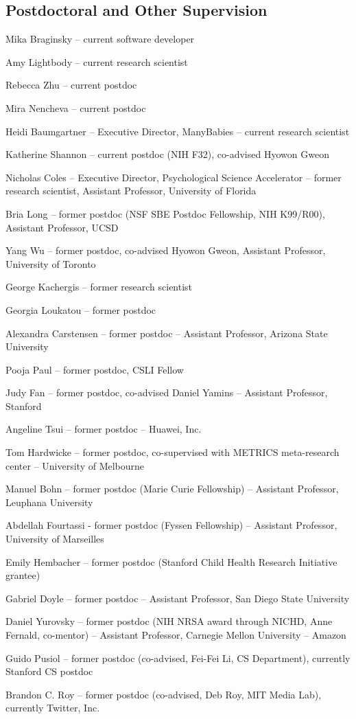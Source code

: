 \documentclass{article}
\renewenvironment{itemize}{
\begin{list}{}{
  \setlength{\leftmargin}{1.5em}
  }
  }{
\end{list}
}
\begin{document}
\subsection*{Postdoctoral and Other Supervision}
\begin{itemize}
  \item Mika Braginsky -- current software developer
  \item Amy Lightbody -- current research scientist
  \item Rebecca Zhu -- current postdoc
  \item Mira Nencheva -- current postdoc
  \item Heidi Baumgartner -- Executive Director, ManyBabies -- current research scientist
  \item Katherine Shannon -- current postdoc (NIH F32), co-advised Hyowon Gweon
  \item Nicholas Coles -- Executive Director, Psychological Science Accelerator -- former research scientist, Assistant Professor, University of Florida
  \item Bria Long -- former postdoc (NSF SBE Postdoc Fellowship, NIH K99/R00), Assistant Professor, UCSD
  \item Yang Wu -- former postdoc, co-advised Hyowon Gweon, Assistant Professor, University of Toronto
  \item George Kachergis -- former research scientist
  \item Georgia Loukatou -- former postdoc
  \item Alexandra Carstensen -- former postdoc -- Assistant Professor, Arizona State University
  \item Pooja Paul -- former postdoc, CSLI Fellow
  \item Judy Fan -- former postdoc, co-advised Daniel Yamins -- Assistant Professor, Stanford
  \item Angeline Tsui -- former postdoc -- Huawei, Inc.
  \item Tom Hardwicke -- former postdoc, co-supervised with METRICS meta-research center -- University of Melbourne
  \item Manuel Bohn -- former postdoc (Marie Curie Fellowship) -- Assistant Professor, Leuphana University
  \item Abdellah Fourtassi - former postdoc (Fyssen Fellowship) -- Assistant Professor, University of Marseilles
  \item Emily Hembacher -- former postdoc (Stanford Child Health Research Initiative grantee)
  \item Gabriel Doyle -- former postdoc -- Assistant Professor, San Diego State University
  \item Daniel Yurovsky -- former postdoc (NIH NRSA award through NICHD, Anne Fernald, co-mentor) -- Assistant Professor, Carnegie Mellon University -- Amazon
  \item Guido Pusiol -- former postdoc (co-advised, Fei-Fei Li, CS Department), currently Stanford CS postdoc
  \item Brandon C. Roy -- former postdoc (co-advised, Deb Roy, MIT Media Lab), currently Twitter, Inc.
\end{itemize}
\end{document}
